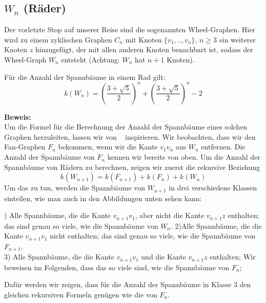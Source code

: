 \subsection{$W_n$ (Räder)}
Der vorletzte Stop auf unserer Reise sind die sogenannten Wheel-Graphen. Hier wird zu einem zyklischen Graphen $C_n$ mit Knoten $\{v_1,..,v_n\}$, $n \geq 3$ ein weiterer Knoten $z$ hinzugefügt, der mit allen anderen Knoten benachbart ist, sodass der Wheel-Graph $W_{n}$ entsteht (Achtung: $W_n$ hat $n+1$ Knoten).
\begin{Tm}
Für die Anzahl der Spannbäume in einem Rad gilt:
\begin{equation}
 \mathit{k}(W_n) = (\frac{3+\sqrt{5}}{2})^n+(\frac{3+\sqrt{5}}{2})^n-2
 \label{wn}
\end{equation}
\end{Tm}
\textbf{Beweis:}\\
Um die Formel für die Berechnung der Anzahl der Spannbäume eines solchen Graphen herzuleiten, lassen wir von ~\cite{sedlacek_1970} inspirieren.
Wir beobachten, dass wir den Fan-Graphen $F_n$ bekommen, wenn wir die Kante $v_1v_n$ aus $W_n$ entfernen.
Die Anzahl der Spannbäume von $F_n$ kennen wir bereits von oben.
Um die Anzahl der Spannbäume von Rädern zu berechnen, zeigen wir zuerst die rekursive Beziehung
\begin{equation}
 \mathit{k}(W_{n+1}) = \mathit{k}(F_{n+1}) + \mathit{k}(F_n) + \mathit{k}(W_n)
\end{equation}
Um das zu tun, werden die Spannbäume von $W_{n+1}$ in drei verschiedene Klassen einteilen, wie man auch in den Abbildungen unten sehen kann:\\
\par %
\begingroup
\leftskip=20pt%
\rightskip=20pt
) Alle Spannbäume, die die Kante $v_{n+1}v_1$, aber nicht die Kante $v_{n+1}z$ enthalten; das sind genau so viele, wie die Spannbäume von $W_n$.
2)Alle Spannbäume, die die Kante $v_{n+1}v_1$ nicht enthalten; das sind genau so viele, wie die Spannbäume von $F_{n+1}$.\\
3) Alle Spannbäume, die die Kante $v_{n+1}v_1$ und die Kante $v_{n+1}z$ enthalten; Wir beweisen im Folgenden, dass das so viele sind, wie die Spannbäume von $F_n$;
\par
\endgroup
Dafür werden wir zeigen, dass für die Anzahl der Spannbäume in Klasse 3 den gleichen rekursiven Formeln genügen wie die von $F_n$.\\


